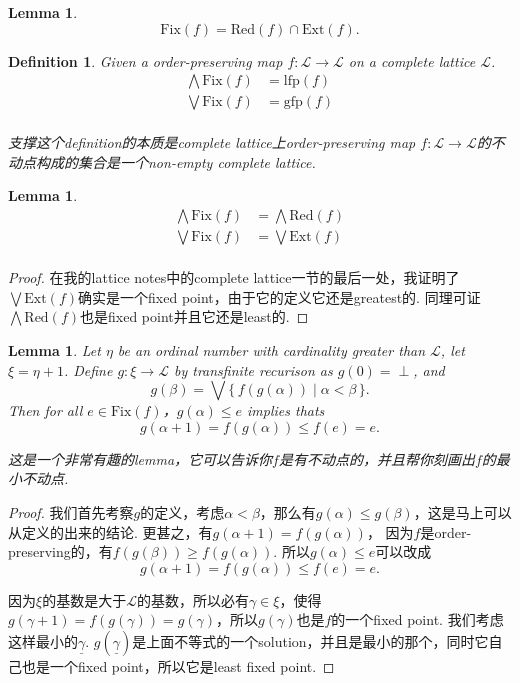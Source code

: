 \documentclass{article}
\newtheorem{lemma}[theorem]{Lemma}
\newtheorem{definition}[theorem]{Definition}
\newcommand*{\xfunc}[4]{{#2}\colon{#3}{#1}{#4}}
\newcommand*{\func}[3]{\xfunc{\to}{#1}{#2}{#3}}
\newcommand\Set[2]{\{\,#1\mid#2\,\}} %
\begin{document}
\begin{lemma} \rm
$$
\text{Fix}(f) = \text{Red}(f) \cap \text{Ext}(f). 
$$
\end{lemma}

\begin{definition}
\rm Given a order-preserving map $\func{f}{\mathcal{L}}{\mathcal{L}}$ on a complete lattice $\mathcal{L}$.
$$
\begin{aligned}
\bigwedge \text{Fix}(f) &= \text{lfp}(f) \\
\bigvee \text{Fix}(f) &= \text{gfp}(f) \\
\end{aligned}
$$

{\color{blue} 支撑这个definition的本质是complete lattice上order-preserving map $\func{f}{\mathcal{L}}{\mathcal{L}}$的不动点构成的集合是一个non-empty complete lattice}. 
\end{definition}


\begin{lemma} \rm
$$
\begin{aligned}
\bigwedge \text{Fix}(f) &= \bigwedge \text{Red}(f) \\
\bigvee \text{Fix}(f) &= \bigvee \text{Ext}(f) \\
\end{aligned}
$$
\end{lemma}

\begin{proof}
在我的lattice notes中的complete lattice一节的最后一处，我证明了$\bigvee \text{Ext}(f)$确实是一个fixed point，由于它的定义它还是greatest的. 同理可证$\bigwedge \text{Red}(f)$也是fixed point并且它还是least的.
\end{proof}

\newpage
\begin{lemma} \rm
Let $\eta$ be an ordinal number with cardinality greater than $\mathcal{L}$, let $\xi = \eta + 1$. Define $\func{g}{\xi}{\mathcal{L}}$ by transfinite recurison as $g(0) = \perp$, and
$$
g(\beta) = \bigvee\Set{f(g(\alpha))}{\alpha < \beta}.
$$
Then for all $e \in \text{Fix}(f)$，$g(\alpha) \leq e$ implies thats
$$
g(\alpha + 1) = f(g(\alpha)) \leq f(e) = e.
$$ 

{\color{blue} 这是一个非常有趣的lemma，它可以告诉你$f$是有不动点的，并且帮你刻画出$f$的最小不动点}.
\end{lemma}

\begin{proof}
我们首先考察$g$的定义，考虑$\alpha < \beta$，那么有$g(\alpha) \leq g(\beta)$，这是马上可以从定义的出来的结论. 更甚之，有$g(\alpha + 1) = f(g(\alpha))$， 因为$f$是order-preserving的，有$f(g(\beta)) \geq f(g(\alpha))$. 所以$g(\alpha) \leq e$可以改成
$$
g(\alpha + 1) = f(g(\alpha)) \leq f(e) = e.
$$

因为$\xi$的基数是大于$\mathcal{L}$的基数，所以必有$\gamma \in \xi$，使得$g(\gamma + 1) = f(g(\gamma)) = g(\gamma)$，所以$g(\gamma)$也是$f$的一个fixed point. 我们考虑这样最小的$\underline{\gamma}$. $g(\underline{\gamma})$是上面不等式的一个solution，并且是最小的那个，同时它自己也是一个fixed point，所以它是least fixed point.
\end{proof}
\end{document}

